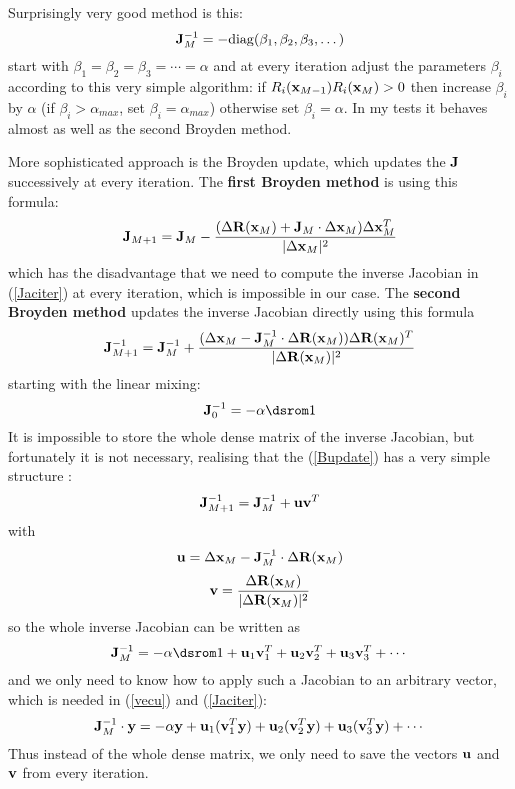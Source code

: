 Surprisingly very good method is this: 
\begin{equation}
  {\bf J}_M^{-1}=-{\rm diag}(\beta_1,\beta_2,\beta_3,\dots)\label{exciting}
\end{equation}
start with $\beta_1=\beta_2=\beta_3=\cdots=\alpha$ and at every iteration adjust the parameters $\beta_i$ according to this very simple algorithm: if $R_i({\bf x}_{M-1})R_i({\bf x}_M)>0$ then increase $\beta_i$ by $\alpha$ (if $\beta_i>\alpha_{max}$, set $\beta_i=\alpha_{max}$) otherwise set $\beta_i=\alpha$. In my tests it behaves almost as well as the second Broyden method.

More sophisticated approach is the Broyden update, which updates the ${\bf J}$ successively at every iteration. The \textbf{first Broyden method} is using this formula: 
\begin{equation*}
  {\bf J}_{M+1}={\bf J}_M-{(\Delta{\bf R}({\bf x}_M)+{\bf J}_M\cdot\Delta{\bf x}_M)\Delta{\bf x}_M^T\over |\Delta{\bf x}_M|^2}
\end{equation*}
which has the disadvantage that we need to compute the inverse Jacobian in (\ref{Jaciter}) at every iteration, which is impossible in our case. The \textbf{second Broyden method} updates the inverse Jacobian directly using this formula 
\begin{equation}
  {\bf J}_{M+1}^{-1}={\bf J}_M^{-1}+{(\Delta{\bf x}_M-{\bf J}_M^{-1}\cdot\Delta{\bf R}({\bf x}_M)) \Delta{\bf R}({\bf x}_M)^T\over |\Delta{\bf R}({\bf x}_M)|^2}  \label{Bupdate}
\end{equation}
starting with the linear mixing: 
\begin{equation*}
  \J_0^{-1}=-\alpha\one
\end{equation*}
It is impossible to store the whole dense matrix of the inverse Jacobian, but fortunately it is not necessary, realising that the (\ref{Bupdate}) has a very simple structure \cite{srivastava}: 
\begin{equation*}
  {\bf J}_{M+1}^{-1}={\bf J}_M^{-1}+{\bf u}{\bf v}^T
\end{equation*}
with 
\begin{equation}
  {\bf u}=\Delta{\bf x}_M-{\bf J}_M^{-1}\cdot\Delta{\bf R}({\bf x}_M)  \label{vecu}
\end{equation}
\begin{equation*}
  {\bf v}={\Delta{\bf R}({\bf x}_M)\over |\Delta{\bf R}({\bf x}_M)|^2}
\end{equation*}
so the whole inverse Jacobian can be written as 
\begin{equation*}
  \J_M^{-1}=-\alpha\one+{\bf u}_1{\bf v}_1^T+{\bf u}_2{\bf v}_2^T+ {\bf u}_3{\bf v}_3^T+\cdots
\end{equation*}
and we only need to know how to apply such a Jacobian to an arbitrary vector, which is needed in (\ref{vecu}) and (\ref{Jaciter}): 
\begin{equation*}
  {\bf J}_M^{-1}\cdot{\bf y}=-\alpha{\bf y}+{\bf u}_1({\bf v}_1^T{\bf y}) +{\bf u}_2({\bf v}_2^T{\bf y})+ {\bf u}_3({\bf v}_3^T{\bf y})+\cdots
\end{equation*}
Thus instead of the whole dense matrix, we only need to save the vectors ${\bf u}$ and ${\bf v}$ from every iteration.

